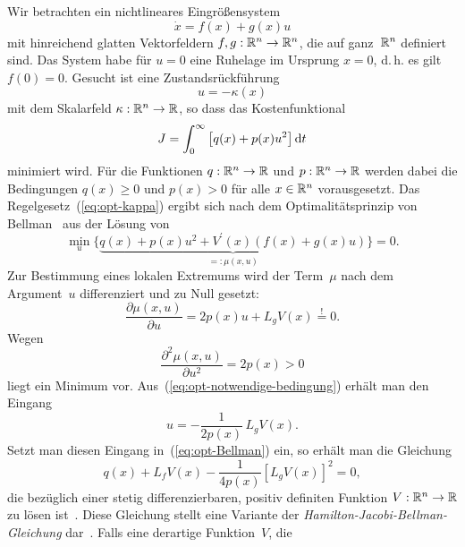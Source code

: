 Wir betrachten ein nichtlineares Eingrößensystem
\begin{equation}
\dot{x}=f(x)+g(x)u\label{eq:basissystem-optimierung}
\end{equation}
mit hinreichend glatten Vektorfeldern $f,g:{\mathbb{R}}^{n}\to{\mathbb{R}}^{n}$, die
auf ganz~${\mathbb{R}}^{n}$ definiert sind. Das System habe für $u=0$ eine
Ruhelage im Ursprung $x=0$, d.\,h. es gilt $f(0)=0$. Gesucht ist
eine Zustandsrückführung
\begin{equation}
u=-\kappa(x)\label{eq:opt-kappa}
\end{equation}
mit dem Skalarfeld $\kappa:{\mathbb{R}}^{n}\to{\mathbb{R}}$, so dass das Kostenfunktional
\begin{equation}
J=\int_{0}^{\infty}\left[q(x)+p(x)u^{2}\right]{\mathrm{d}} t\label{eq:opt-Kosten-nl}
\end{equation}
minimiert wird. Für die Funktionen $q:{\mathbb{R}}^{n}\to{\mathbb{R}}$ und $p:{\mathbb{R}}^{n}\to{\mathbb{R}}$
werden dabei die Bedingungen $q(x)\geq0$ und $p(x)>0$ für alle $x\in{\mathbb{R}}^{n}$
vorausgesetzt. Das Regelgesetz~(\ref{eq:opt-kappa}) ergibt sich
nach dem Optimalitätsprinzip von Bellman~\cite{sontag98} aus der
Lösung von
\begin{equation}
\min_{u}\{\underbrace{q(x)+p(x)u^{2}+V^{\prime}(x)\left(f(x)+g(x)u\right)}_{{\displaystyle =:\mu(x,u)}}\}=0.\label{eq:opt-Bellman}
\end{equation}
Zur Bestimmung eines lokalen Extremums wird der Term~$\mu$ nach
dem Argument~$u$ differenziert und zu Null gesetzt:
\begin{equation}
\frac{\partial\mu(x,u)}{\partial u}=2p(x)u+L_{g}V(x)\stackrel{!}{=}0.\label{eq:opt-notwendige-bedingung}
\end{equation}
Wegen 
\[
\frac{\partial^{2}\mu(x,u)}{\partial u^{2}}=2p(x)>0
\]
liegt ein Minimum vor. Aus~(\ref{eq:opt-notwendige-bedingung}) erhält
man den Eingang
\begin{equation}
u=-\frac{1}{2p(x)}\,L_{g}V(x).\label{eq:opt-u-Regelgesetz}
\end{equation}
Setzt man diesen Eingang in~(\ref{eq:opt-Bellman}) ein, so erhält
man die Gleichung
\begin{equation}
q(x)+L_{f}V(x)-\frac{1}{4p(x)}\left[L_{g}V(x)\right]^{2}=0,\label{eq:HJB}
\end{equation}
die bezüglich einer stetig differenzierbaren, positiv definiten Funktion
$V:{\mathbb{R}}^{n}\to{\mathbb{R}}$ zu lösen ist~\cite[Abschnitt~{8.5}]{sontag98}.
Diese Gleichung stellt eine Variante der \emph{Hamilton-Jacobi-Bellman-Gleichung}
dar~\cite{sepulchre97}. Falls eine derartige Funktion~$V$, die

